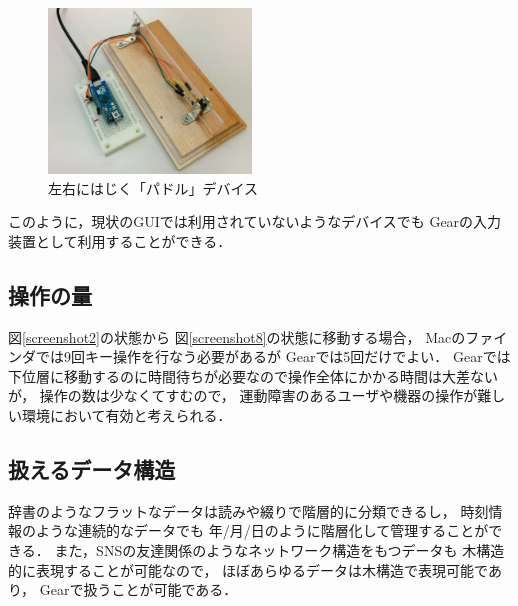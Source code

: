 \documentclass[twoside]{wiss}
\def\GEAR{\textsf{Gear}}
\begin{document}
\begin{figure}[H]
  \centerline{\includegraphics[width=54mm,bb=0 0 514 418]{figures/3c2de63899653056f3c6be835b9aaf43.png}}
\caption{左右にはじく「パドル」デバイス}
\label{paddle}
\end{figure}

\noindent
このように，現状のGUIでは利用されていないようなデバイスでも
{\GEAR}の入力装置として利用することができる．

\subsection{操作の量}

図\ref{screenshot2}の状態から
図\ref{screenshot8}の状態に移動する場合，
Macのファインダでは9回キー操作を行なう必要があるが
{\GEAR}では5回だけでよい．
{\GEAR}では下位層に移動するのに時間待ちが必要なので操作全体にかかる時間は大差ないが，
操作の数は少なくてすむので，
運動障害のあるユーザや機器の操作が難しい環境において有効と考えられる．

\subsection{扱えるデータ構造}

辞書のようなフラットなデータは読みや綴りで階層的に分類できるし，
時刻情報のような連続的なデータでも
年/月/日のように階層化して管理することができる．
また，SNSの友達関係のようなネットワーク構造をもつデータも
木構造的に表現することが可能なので，
ほぼあらゆるデータは木構造で表現可能であり，
{\GEAR}で扱うことが可能である．

% 
% 
% 
\end{document}

